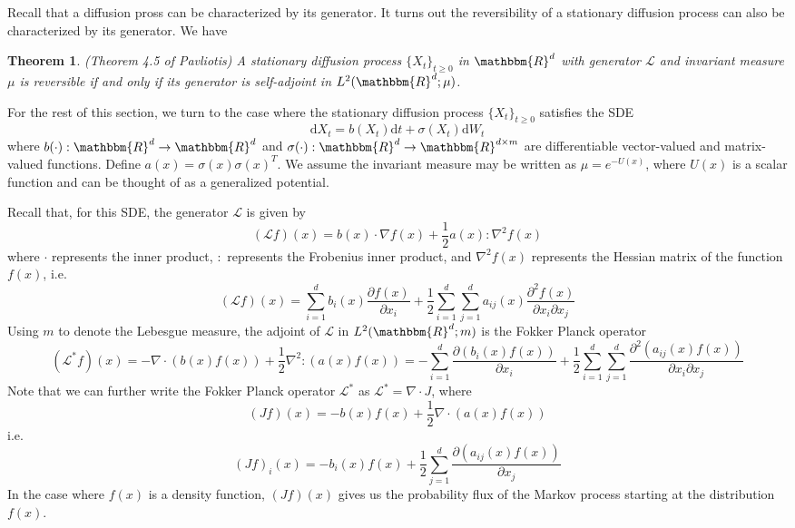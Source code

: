 \documentclass[english, aip, jcp, priprint, graphicx]{revtex4-1}
\newtheorem{theorem}{Theorem}
\theoremstyle{plain}
\theoremstyle{definition}
\theoremstyle{plain}
\begin{document}
Recall that a diffusion pross can be characterized by its generator. It turns
out the reversibility of a stationary diffusion process can also be
characterized by its generator. We have

\begin{theorem}
\label{thm:reversibility}(Theorem 4.5 of Pavliotis\cite{Pavliotis2016-xn}) A
stationary diffusion process $\{X_t\}_{t \geqslant 0}$ in $\mathbbm{R}^d$ with generator
$\mathcal{L}$ and invariant measure ${\mu}$ is reversible if and only if
its generator is self-adjoint in $L^2 (\mathbbm{R}^d ; {\mu})$.
\end{theorem}

For the rest of this section, we turn to the case where the stationary
diffusion process $\{X_t\}_{t \geqslant 0}$ satisfies the SDE
\[ \mathrm{d} X_t = b (X_t) \mathrm{d} t + \sigma (X_t) \mathrm{d} W_t \]
where $b (\cdot) : \mathbbm{R}^d \rightarrow \mathbbm{R}^d$ and $\sigma
(\cdot) : \mathbbm{R}^d \rightarrow \mathbbm{R}^{d \times m}$ are
differentiable vector-valued and matrix-valued functions. Define $a (x) =
\sigma (x) \sigma (x)^T$. We assume the invariant measure may be written as
${\mu}= e^{- U (x)}$, where $U (x)$ is a scalar function and can be
thought of as a generalized potential.

Recall that, for this SDE, the generator $\mathcal{L}$ is given by
\[ (\mathcal{L} f) (x) = b (x) \cdot \nabla f (x) + \frac{1}{2} a (x) :
\nabla^2 f (x) \]
where $\cdot$ represents the inner product, $:$ represents the Frobenius inner
product, and $\nabla^2 f (x)$ represents the Hessian matrix of the function $f
(x)$, i.e.
\[ (\mathcal{L} f) (x) = \sum_{i = 1}^d b_i (x) \frac{\partial f
(x)}{\partial x_i} + \frac{1}{2} \sum_{i = 1}^d \sum_{j = 1}^d a_{ij} (x)
\frac{\partial^2 f (x)}{\partial x_i \partial x_j} \]
Using $m$ to denote the Lebesgue measure, the adjoint of $\mathcal{L}$ in $L^2
(\mathbbm{R}^d ; m)$ is the Fokker Planck operator
\[ (\mathcal{L}^{\ast} f) (x) = - \nabla \cdot (b (x) f (x)) + \frac{1}{2}
\nabla^2 : (a (x) f (x)) = - \sum_{i = 1}^d \frac{\partial (b_i (x) f
(x))}{\partial x_i} + \frac{1}{2} \sum_{i = 1}^d \sum_{j = 1}^d
\frac{\partial^2 (a_{ij} (x) f (x))}{\partial x_i \partial x_j} \]
Note that we can further write the Fokker Planck operator $\mathcal{L}^{\ast}$
as $\mathcal{L}^{\ast} = \nabla \cdot J$, where
\[ (J f) (x) = - b (x) f (x) + \frac{1}{2} \nabla \cdot (a (x) f (x)) \]
i.e.
\[ (J f)_i (x) = - b_i (x) f (x) + \frac{1}{2} \sum_{j = 1}^d \frac{\partial
(a_{ij} (x) f (x))}{\partial x_j} \]
In the case where $f (x)$ is a density function, $(J f) (x)$ gives us the
probability flux of the Markov process starting at the distribution $f (x)$.
\end{document}
